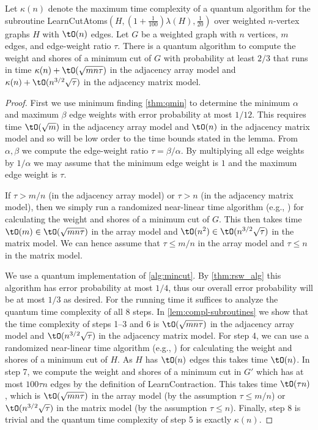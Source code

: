 \begin{lemma}
\label{lem:kappa}
Let $\kappa(n)$ denote the maximum time complexity of a quantum algorithm for the subroutine LearnCutAtoms$(H,(1+\frac{1}{100})\lambda(H),\frac{1}{20})$ over weighted $n$-vertex graphs $H$ with $\tO(n)$ edges.
Let $G$ be a weighted graph with $n$ vertices, $m$ edges, and edge-weight ratio $\tau$.
There is a quantum algorithm to compute the weight and shores of a minimum cut of $G$ with probability at least $2/3$
that runs in time $\kappa(n) + \tO(\sqrt{mn\tau})$ in the adjacency array model and 
$\kappa(n) + \tO(n^{3/2}\sqrt{\tau})$ in the adjacency matrix model.
\end{lemma}
\begin{proof}
First we use minimum finding \cref{thm:qmin} to determine the minimum $\alpha$ and maximum $\beta$ edge weights with error probability at most $1/12$.  This requires time 
$\tO(\sqrt{m})$ in the adjacency array model and $\tO(n)$ in the adjacency matrix model and so will be low order to the time bounds stated in the lemma.  From $\alpha, \beta$ we compute the 
edge-weight ratio $\tau = \beta/\alpha$.  By multiplying all edge weights by $1/\alpha$ we may assume that the minimum edge weight is $1$ and 
the maximum edge weight is $\tau$.

If $\tau > m/n$ (in the adjacency array model) or $\tau > n$ (in the adjacency matrix model), then we simply run a randomized near-linear time algorithm (e.g., \cite{Karger00}) for calculating the weight and shores of a minimum cut of $G$.
This then takes time $\tO(m) \in \tO(\sqrt{mn\tau})$ in the array model and $\tO(n^2) \in \tO(n^{3/2}\sqrt{\tau})$ in the matrix model.
We can hence assume that $\tau \leq m/n$ in the array model and $\tau \leq n$ in the matrix model.

We use a quantum implementation of \cref{alg:mincut}.  By \cref{thm:rsw_alg} this algorithm has error probability at most $1/4$, thus our overall error probability will be at most $1/3$ as desired.  
For the running time it suffices to analyze the quantum time complexity of all 8 steps.
In \cref{lem:compl-subroutines} we show that the time complexity of steps 1--3 and 6 is $\tO(\sqrt{mn\tau})$ in the adjacency array model and $\tO(n^{3/2}\sqrt{\tau})$ in the adjacency matrix model.
For step 4, we can use a randomized near-linear time algorithm (e.g., \cite{Karger00}) for calculating the weight and shores of a minimum cut of $H$.  As $H$ has $\tO(n)$ edges this takes time $\tO(n)$.
In step 7, we compute the weight and shores of a minimum cut in $G'$ which has at most $100\tau n$ edges by the definition of LearnContraction.  This takes time $\tO(\tau n)$, which is $\tO(\sqrt{mn\tau})$ in the array model (by the assumption $\tau \leq m/n$) or $\tO(n^{3/2} \sqrt{\tau})$ in the matrix model (by the assumption $\tau \leq n$).
Finally, step 8 is trivial and the quantum time complexity of step 5 is exactly $\kappa(n)$.
\end{proof}

